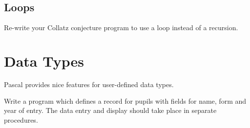 \documentclass{../../tp}
\begin{document}
\subsection{Loops}
\begin{instruction}
Re-write your Collatz conjecture program to use a loop instead of a recursion.
\end{instruction}


\section{Data Types}

Pascal provides nice features for user-defined data types. 


\begin{instruction}
	Write a program which defines a record for pupils with fields for name, form and year of entry. The data entry and display should take place in separate procedures.
\end{instruction}
\end{document}
